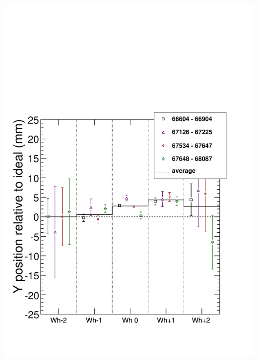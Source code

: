 \documentclass[compress]{beamer}
\begin{document}
\begin{frame}
{\begin{columns}
\includegraphics[width=\linewidth]{bydataset_HIPSC_y.pdf}
\end{columns}}
\end{frame}
\end{document}
